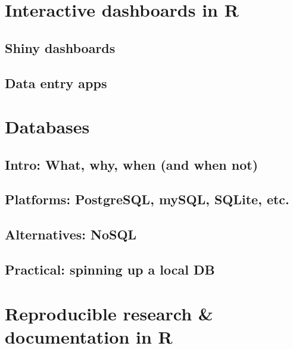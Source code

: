 \documentclass[
]{book}
\begin{document}
\hypertarget{interactive-dashboards-in-r}{%
\chapter{Interactive dashboards in R}\label{interactive-dashboards-in-r}}

\hypertarget{shiny-dashboards}{%
\section{Shiny dashboards}\label{shiny-dashboards}}

\hypertarget{data-entry-apps}{%
\section{Data entry apps}\label{data-entry-apps}}

\hypertarget{databases}{%
\chapter{Databases}\label{databases}}

\hypertarget{intro-what-why-when-and-when-not}{%
\section{Intro: What, why, when (and when not)}\label{intro-what-why-when-and-when-not}}

\hypertarget{platforms-postgresql-mysql-sqlite-etc.}{%
\section{Platforms: PostgreSQL, mySQL, SQLite, etc.}\label{platforms-postgresql-mysql-sqlite-etc.}}

\hypertarget{alternatives-nosql}{%
\section{Alternatives: NoSQL}\label{alternatives-nosql}}

\hypertarget{practical-spinning-up-a-local-db}{%
\section{Practical: spinning up a local DB}\label{practical-spinning-up-a-local-db}}

\hypertarget{reproducible-research-documentation-in-r}{%
\chapter{Reproducible research \& documentation in R}\label{reproducible-research-documentation-in-r}}
\end{document}
